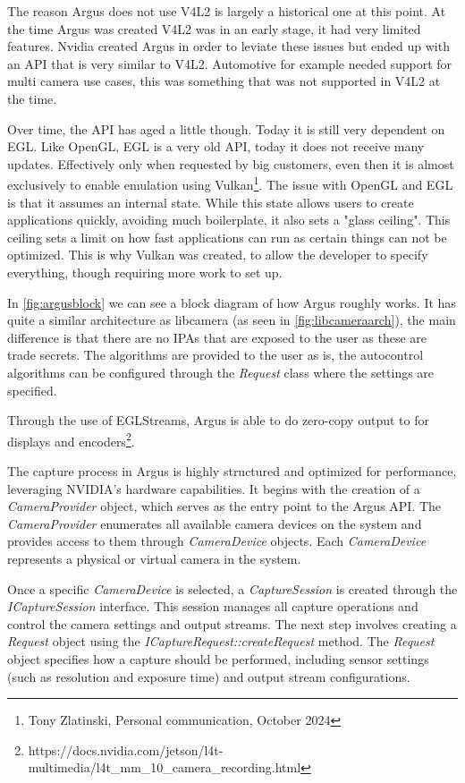 The reason Argus does not use V4L2 is largely a historical one at this point.
At the time Argus was created V4L2 was in an early stage, it had very limited
features. Nvidia created Argus in order to leviate these issues but ended up
with an API that is very similar to V4L2. Automotive for example needed support
for multi camera use cases, this was something that was not supported in V4L2 at
the time.

Over time, the API has aged a little though. Today it is still very dependent
on EGL. Like OpenGL, EGL is a very old API, today it does not receive many
updates. Effectively only when requested by big customers, even then it is
almost exclusively to enable emulation using Vulkan\footnote{Tony Zlatinski,
Personal communication, October 2024}. The issue with OpenGL and EGL is that it
assumes an internal state. While this state allows users to create applications
quickly, avoiding much boilerplate, it also sets a "glass ceiling". This
ceiling sets a limit on how fast applications can run as certain things can not
be optimized. This is why Vulkan was created, to allow the developer to specify
everything, though requiring more work to set up.

In \cref{fig:argusblock} we can see a block diagram of how Argus roughly works.
It has quite a similar architecture as libcamera (as seen in
\cref{fig:libcameraarch}), the main difference is that there are no IPAs that
are exposed to the user as these are trade secrets. The algorithms are provided
to the user as is, the autocontrol algorithms can be configured through the
\textit{Request} class where the settings are specified.

Through the use of EGLStreams, Argus is able to do zero-copy output to for
displays and encoders\footnote{https://docs.nvidia.com/jetson/l4t-multimedia/l4t\_mm\_10\_camera\_recording.html}.

The capture process in Argus is highly structured and optimized for
performance, leveraging NVIDIA’s hardware capabilities. It begins with the
creation of a \textit{CameraProvider} object, which serves as the entry point
to the Argus API. The \textit{CameraProvider} enumerates all available camera
devices on the system and provides access to them through
\textit{CameraDevice} objects. Each \textit{CameraDevice} represents a
physical or virtual camera in the system.

Once a specific \textit{CameraDevice} is selected, a \textit{CaptureSession} is
created through the \textit{ICaptureSession} interface. This session manages
all capture operations and control the camera settings and output streams. The
next step involves creating a \textit{Request} object using the
\textit{ICaptureRequest::createRequest} method. The \textit{Request} object
specifies how a capture should be performed, including sensor settings (such as
resolution and exposure time) and output stream configurations.

